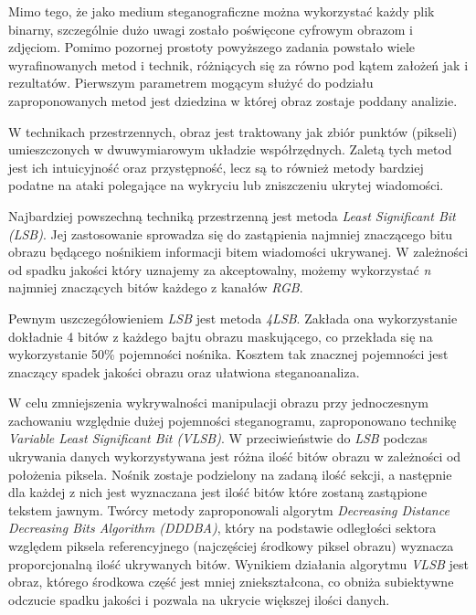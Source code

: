 {    %
    Mimo tego, że jako medium steganograficzne można wykorzystać każdy plik binarny,
    szczególnie dużo uwagi zostało poświęcone cyfrowym obrazom i zdjęciom.
    Pomimo pozornej prostoty powyższego zadania powstało wiele wyrafinowanych metod i technik, różniących się za równo pod kątem
    założeń jak i rezultatów. 
    Pierwszym parametrem mogącym służyć do podziału zaproponowanych metod jest dziedzina w której 
    obraz zostaje poddany analizie. 

    W technikach przestrzennych, obraz jest traktowany jak zbiór punktów (pikseli) umieszczonych w dwuwymiarowym układzie współrzędnych.
    Zaletą tych metod jest ich intuicyjność oraz przystępność, lecz są to również metody bardziej podatne na ataki polegające na wykryciu
    lub zniszczeniu ukrytej wiadomości. %

    Najbardziej powszechną techniką przestrzenną jest metoda \textit{Least Significant Bit (LSB)}. Jej zastosowanie sprowadza się
    do zastąpienia najmniej znaczącego bitu obrazu będącego nośnikiem informacji bitem wiadomości ukrywanej. W zależności od spadku
    jakości który uznajemy za akceptowalny, możemy wykorzystać \textit{n} najmniej znaczących bitów każdego z kanałów \textit{RGB}.

    Pewnym uszczegółowieniem \textit{LSB} jest metoda \textit{4LSB}. Zakłada ona wykorzystanie dokładnie 4 bitów z każdego bajtu
    obrazu maskującego, co przekłada się na wykorzystanie 50\% pojemności nośnika. Kosztem tak znacznej pojemności jest znaczący spadek
    jakości obrazu oraz ułatwiona steganoanaliza.

    W celu zmniejszenia wykrywalności manipulacji obrazu przy jednoczesnym zachowaniu względnie dużej pojemności steganogramu,
    zaproponowano technikę \textit{Variable Least Significant Bit (VLSB)}. W przeciwieństwie do \textit{LSB} podczas ukrywania danych
    wykorzystywana jest różna ilość bitów obrazu w zależności od położenia piksela.
    Nośnik zostaje podzielony na zadaną ilość sekcji, a następnie dla każdej z nich jest wyznaczana jest ilość bitów które zostaną
    zastąpione tekstem jawnym. Twórcy metody zaproponowali algorytm \textit{Decreasing Distance Decreasing Bits Algorithm (DDDBA)},
    który na podstawie odległości sektora względem piksela referencyjnego (najczęściej środkowy piksel obrazu) wyznacza proporcjonalną
    ilość ukrywanych bitów. Wynikiem działania algorytmu \textit{VLSB} jest obraz, którego środkowa część jest mniej zniekształcona,
    co obniża subiektywne odczucie spadku jakości i pozwala na ukrycie większej ilości danych. %

    
    

}

